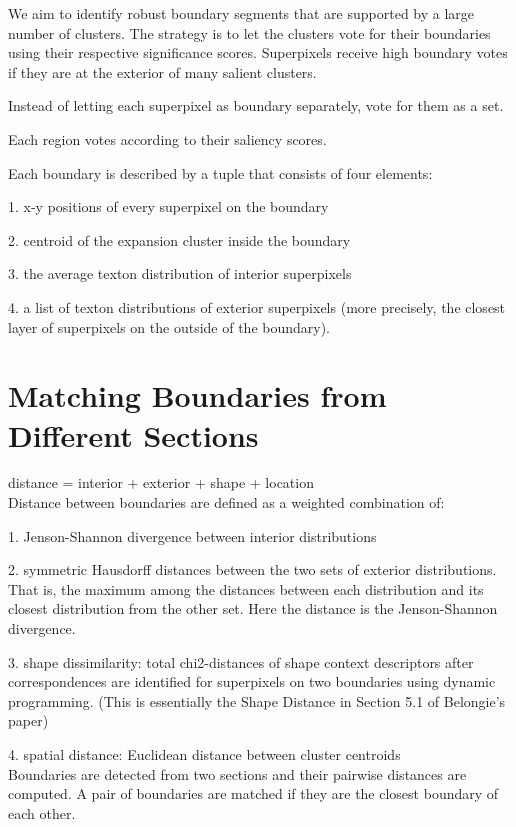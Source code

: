 \documentclass{llncs}
\begin{document}
We aim to identify robust boundary segments that are supported by a large number of clusters. The strategy is to let the clusters vote for their boundaries using their respective significance scores. Superpixels receive high boundary votes if they are at the exterior of many salient clusters.


Instead of letting each superpixel as boundary separately, vote for them as a set.

Each region votes according to their saliency scores.

Each boundary is described by a tuple that consists of four elements:

1. x-y positions of every superpixel on the boundary

2. centroid of the expansion cluster inside the boundary

3. the average texton distribution of interior superpixels

4. a list of texton distributions of exterior superpixels (more precisely, the closest layer of superpixels on the outside of the boundary).

\section{Matching Boundaries from Different Sections}

distance = interior + exterior + shape + location 
\\

Distance between boundaries are defined as a weighted combination of:

1. Jenson-Shannon divergence between interior distributions

2. symmetric Hausdorff distances between the two sets of exterior distributions. That is, the maximum among the distances between each distribution and its closest distribution from the other set. Here the distance is the Jenson-Shannon divergence.

3. shape dissimilarity: total chi2-distances of shape context descriptors after correspondences are identified for superpixels on two boundaries using dynamic programming. (This is essentially the Shape Distance in Section 5.1 of Belongie's paper)

4. spatial distance: Euclidean distance between cluster centroids
\\

Boundaries are detected from two sections and their pairwise distances are computed. A pair of boundaries are matched if they are the closest boundary of each other.
\end{document}
